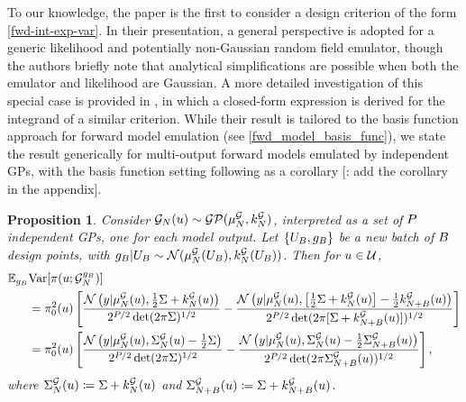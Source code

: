\documentclass[12pt]{article}
\newtheorem{prop}{Proposition}
\begin{document}
To our knowledge, the paper \cite{SinsbeckNowak} is the first to consider a design criterion of the 
form \ref{fwd-int-exp-var}. In their presentation, a general perspective is adopted for a generic likelihood and 
potentially non-Gaussian random field emulator, though the authors briefly note that analytical simplifications 
are possible when both the emulator and likelihood are Gaussian. A more detailed investigation of this 
special case is provided in \cite{Surer2023sequential}, in which a closed-form expression is derived for the 
integrand of a similar criterion. While their result is tailored to the basis function approach for forward model 
emulation (see \ref{fwd_model_basis_func}), we state the result generically for multi-output forward models 
emulated by independent GPs, with the basis function setting following as a corollary
[\todo: add the corollary in the appendix].  
\begin{prop} \label{prop:evar-fwd-emulation}
Consider 
$\fwdEm(\Par) \sim \GP(\emMean[\Ndesign]{\fwd}, \emKer[\Ndesign]{\fwd})$, interpreted as a set of $\dimObs$ independent 
GPs, one for each model output. Let $\{\designBatchIn, \designBatchFwd\}$ be a new batch of $\Nbatch$ 
design points, with
$\designBatchFwd | \designBatchIn \sim \Gaussian(\emMean[\Ndesign]{\fwd}(\designBatchIn), \emKer[\Ndesign]{\fwd}(\designBatchIn))$.
Then for $\Par \in \parSpace$, 
\begin{align}
\E_{\designBatchFwd} &\Var[\postDens(\Par; \fwdEmCond{\designBatchFwd})] \nonumber \\
&= \priorDens^2(\Par) \left[\frac{\Gaussian\left(\obs | \emMean{\fwd}(\Par), \frac{1}{2}\likPar + \emKer{\fwd}(\Par) \right)}{2^{\dimObs/2} \det(2\pi \likPar)^{1/2}} - 
\frac{\Gaussian\left(\obs | \emMean{\fwd}(\Par), \left[\frac{1}{2}\likPar + \emKer{\fwd}(\Par)\right] - \frac{1}{2}\emKer[\Naugment]{\fwd}(\Par) \right)}{2^{\dimObs/2} \det(2\pi [\likPar + \emKer[\Naugment]{\fwd}(\Par)])^{1/2}} \right] \label{fwd_evar1} \\
&= \priorDens^2(\Par) \left[\frac{\Gaussian\left(\obs | \emMean{\fwd}(\Par), \CovComb(\Par) - \frac{1}{2}\likPar \right)}{2^{\dimObs/2} \det(2\pi \likPar)^{1/2}} - 
\frac{\Gaussian\left(\obs | \emMean{\fwd}(\Par), \CovComb(\Par) - \frac{1}{2}\CovComb[\Naugment](\Par) \right)}{2^{\dimObs/2} \det(2\pi \CovComb[\Naugment](\Par))^{1/2}} \right], \label{fwd_evar2}
\end{align}
where $\CovComb(\Par) \Def \likPar + \emKer{\fwd}(\Par)$ and $\CovComb[\Naugment](\Par) \Def \likPar + \emKer[\Naugment]{\fwd}(\Par)$. 
\end{prop}
\end{document}
